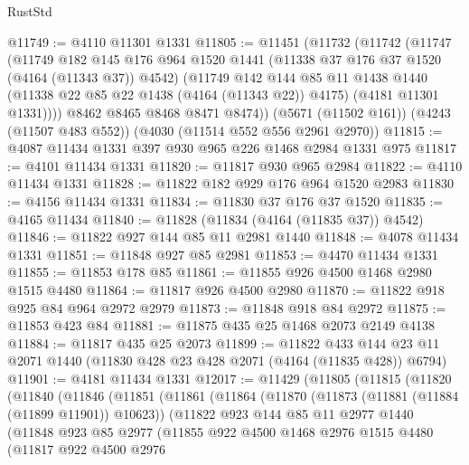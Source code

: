 \begin{lexlean}{RustStd}
\begin{coremodule}
@11749 := @4110 @11301 @1331
@11805 := @11451
    (@11732
      (@11742
        (@11747
          (@11749
            @182
            @145
            @176
            @964
            @1520
            @1441
            (@11338 @37 @176 @37 @1520 (@4164 (@11343 @37)) @4542)
            (@11749
              @142
              @144
              @85
              @11
              @1438
              @1440
              (@11338 @22 @85 @22 @1438 (@4164 (@11343 @22)) @4175)
              (@4181 @11301 @1331))))
        @8462
        @8465
        @8468
        @8471
        @8474))
    (@5671 (@11502 @161))
    (@4243 (@11507 @483 @552))
    (@4030 (@11514 @552 @556 @2961 @2970))
@11815 := @4087 @11434 @1331 @397 @930 @965 @226 @1468 @2984 @1331 @975
@11817 := @4101 @11434 @1331
@11820 := @11817 @930 @965 @2984
@11822 := @4110 @11434 @1331
@11828 := @11822 @182 @929 @176 @964 @1520 @2983
@11830 := @4156 @11434 @1331
@11834 := @11830 @37 @176 @37 @1520
@11835 := @4165 @11434
@11840 := @11828 (@11834 (@4164 (@11835 @37)) @4542)
@11846 := @11822 @927 @144 @85 @11 @2981 @1440
@11848 := @4078 @11434 @1331
@11851 := @11848 @927 @85 @2981
@11853 := @4470 @11434 @1331
@11855 := @11853 @178 @85
@11861 := @11855 @926 @4500 @1468 @2980 @1515 @4480
@11864 := @11817 @926 @4500 @2980
@11870 := @11822 @918 @925 @84 @964 @2972 @2979
@11873 := @11848 @918 @84 @2972
@11875 := @11853 @423 @84
@11881 := @11875 @435 @25 @1468 @2073 @2149 @4138
@11884 := @11817 @435 @25 @2073
@11899 := @11822
    @433
    @144
    @23
    @11
    @2071
    @1440
    (@11830 @428 @23 @428 @2071 (@4164 (@11835 @428)) @6794)
@11901 := @4181 @11434 @1331
@12017 := @11429
    (@11805
      (@11815
        (@11820
          (@11840
            (@11846
              (@11851
                (@11861
                  (@11864
                    (@11870
                      (@11873 (@11881 (@11884 (@11899 @11901)) @10623))
                      (@11822
                        @923
                        @144
                        @85
                        @11
                        @2977
                        @1440
                        (@11848
                          @923
                          @85
                          @2977
                          (@11855
                            @922
                            @4500
                            @1468
                            @2976
                            @1515
                            @4480
                            (@11817
                              @922
                              @4500
                              @2976

\end{coremodule}
\end{lexlean}
